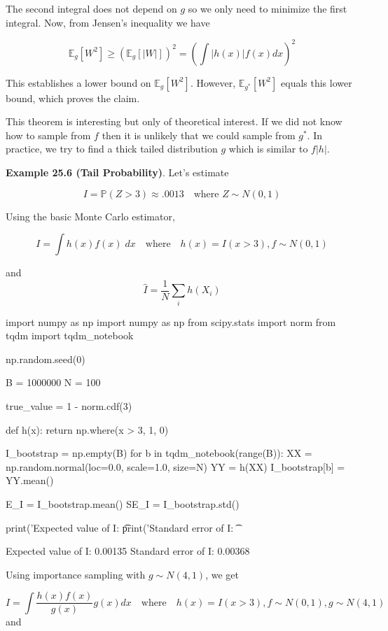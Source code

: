The second integral does not depend on \(g\) so we only need to minimize
the first integral. Now, from Jensen's inequality we have

\[ \mathbb{E}_g[W^2] \geq \left(\mathbb{E}_g[|W|]\right)^2 = \left( \int |h(x)| f(x) dx \right)^2 \]

This establishes a lower bound on \(\mathbb{E}_g[W^2]\). However,
\(\mathbb{E}_{g^*}[W^2]\) equals this lower bound, which proves the
claim.

This theorem is interesting but only of theoretical interest. If we did
not know how to sample from \(f\) then it is unlikely that we could
sample from \(g^*\). In practice, we try to find a thick tailed
distribution \(g\) which is similar to \(f |h|\).

\textbf{Example 25.6 (Tail Probability)}. Let's estimate

\[ I = \mathbb{P}(Z > 3) \approx .0013
\quad \text{where } Z \sim N(0, 1)\]

Using the basic Monte Carlo estimator,

\[ I = \int h(x) f(x) \; dx \quad \text{where} \quad h(x) = I(x > 3), f \sim N(0, 1)\]

and \[ \hat{I} = \frac{1}{N} \sum_i h(X_i) \]

\begin{python}
import numpy as np
import numpy as np
from scipy.stats import norm
from tqdm import tqdm_notebook

np.random.seed(0)

B = 1000000
N = 100

true_value = 1 - norm.cdf(3)

def h(x):
    return np.where(x > 3, 1, 0)

I_bootstrap = np.empty(B)
for b in tqdm_notebook(range(B)):
    XX = np.random.normal(loc=0.0, scale=1.0, size=N)
    YY = h(XX)
    I_bootstrap[b] = YY.mean()

E_I = I_bootstrap.mean()
SE_I = I_bootstrap.std()

print('Expected value of I: \t %
print('Standard error of I: \t %
\end{python}

\begin{console}
Expected value of I:     0.00135
Standard error of I:     0.00368
    \end{console}

Using importance sampling with \(g \sim N(4, 1)\), we get

\[ I = \int \frac{h(x) f(x)}{g(x)} g(x) dx
\quad \text{where} \quad h(x) = I(x > 3), f \sim N(0, 1), g \sim N(4, 1)\]
and

